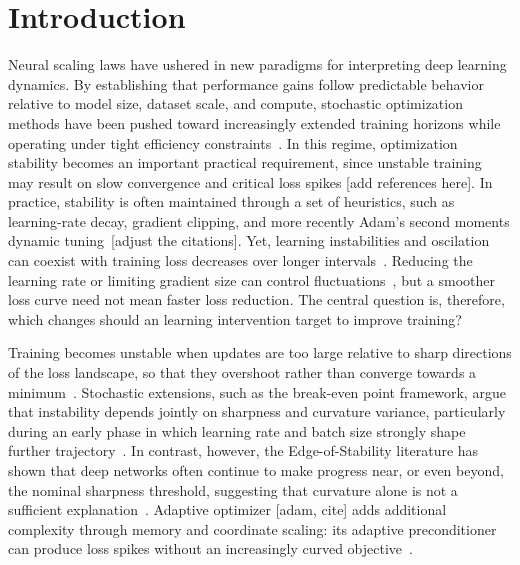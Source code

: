 \section{Introduction}
\label{sec:introduction}


Neural scaling laws have ushered in new paradigms for interpreting deep learning dynamics. By establishing that performance gains follow predictable behavior relative to model size, dataset scale, and compute, stochastic optimization methods have been pushed toward increasingly extended training horizons while operating under tight efficiency constraints~\cite{hestness2017deep, kaplan2020scaling, henighan2020scaling, hoffmann2022chinchilla}. In this regime, optimization stability becomes an important practical requirement, since unstable training may result on slow convergence and critical loss spikes [add references here]. In practice, stability is often maintained through a set of heuristics, such as learning-rate decay, gradient clipping, and more recently Adam's second moments dynamic tuning~\cite{goyal2017accurate, smith2017cyclical, loshchilov2016sgdr, ioffe2015batch, krogh1991simple}[adjust the citations]. Yet, learning instabilities and oscilation can coexist with training loss decreases over longer intervals~\cite{cohen2021edge,damian2023self}. Reducing the learning rate or limiting gradient size can control fluctuations~\cite{smith2017cyclical,pascanu2013difficulty}, but a smoother loss curve need not mean faster loss reduction. The central question is, therefore, which changes should an learning intervention target to improve training?

Training becomes unstable when updates are too large relative to sharp directions of the loss landscape, so that they overshoot rather than converge towards a minimum~\cite{polyak1964methods, bertsekas1997nonlinear}. Stochastic extensions, such as the break-even point framework, argue that instability depends jointly on sharpness and curvature variance, particularly during an early phase in which learning rate and batch size strongly shape further trajectory~\cite{jastrzebski2020break}. In contrast, however, the Edge-of-Stability literature has shown that deep networks often continue to make progress near, or even beyond, the nominal sharpness threshold, suggesting that curvature alone is not a sufficient explanation~\cite{cohen2021edge, arora2022understanding, damian2023self}. Adaptive optimizer [adam, cite] adds additional complexity through memory and coordinate scaling: its adaptive preconditioner can produce loss spikes without an increasingly curved objective~\cite{bai2026spikes}.

